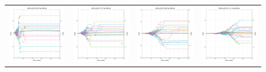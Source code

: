 \begin{figure}
\begin{tabular}{cccc}
\hspace{-0.5cm}\includegraphics[width = 1.55in]{images/Visualizations/ANNvsMCTS/4000ms5x5.png} &
\hspace{-0.5cm}\includegraphics[width = 1.55in]{images/Visualizations/ANNvsMCTS/4000ms7x7.png} &
\hspace{-0.5cm}\includegraphics[width = 1.55in]{images/Visualizations/ANNvsMCTS/4000ms9x9.png} &
\hspace{-0.5cm}\includegraphics[width = 1.55in]{images/Visualizations/ANNvsMCTS/4000ms11x11.png} \\


\end{tabular}
\end{figure}
